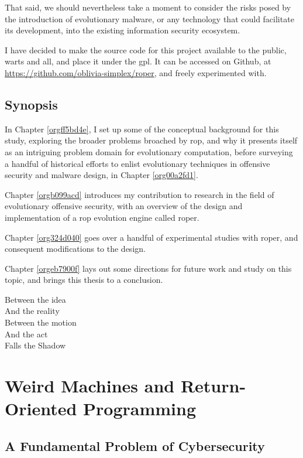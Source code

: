 \documentclass[12pt,glossary]{dalthesis}
\begin{document}
That said, we should nevertheless take a moment to consider the risks posed
by the introduction of evolutionary malware, or any technology that could facilitate
its development, into the existing information security ecosystem.


I have decided to make the source code for this project available to the public,
warts and all, and place it under the \gls{gpl}. It can be accessed on Github,
at \url{https://github.com/oblivia-simplex/roper}, and freely experimented with. 


\section{Synopsis}
\label{sec:org0acb005}
\label{org1962aed}

In Chapter \ref{orgff5bd4e}, I set up some of the conceptual
background for this study, exploring the broader problems broached by \gls{rop}, 
and why it presents itself as an intriguing problem domain for evolutionary
computation, before surveying a handful of historical efforts to
enlist evolutionary techniques in offensive security and malware
design, in Chapter \ref{org00a2fd1}.

Chapter \ref{orgb099acd} introduces my contribution to research in the field of
evolutionary offensive security, with an overview of the design and implementation of
a \gls{rop} evolution engine called \gls{roper}.

Chapter \ref{org324d040} goes over a handful of experimental studies with
\gls{roper}, and consequent modifications to the design. 

Chapter \ref{orgeb7900f} lays out some directions for future work and study on this
topic, and brings this thesis to a conclusion.



\begin{savequote}
Between the idea\\  
And the reality\\  
Between the motion\\ 
And the act\\
Falls the Shadow
\end{savequote}
\chapter{Weird Machines and Return-Oriented Programming}
\label{sec:orgf3b36c4}
\label{orgff5bd4e}
\label{org5048da9}
\section{A Fundamental Problem of Cybersecurity}
\label{sec:orgdb2031d}
\label{orge7420af}
\end{document}
